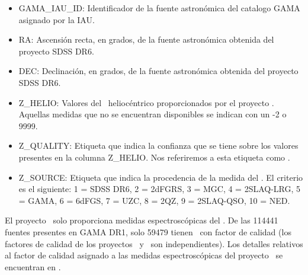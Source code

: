 \begin{itemize}
    \setlength\itemsep{-1mm}
    \item GAMA\_IAU\_ID: Identificador de la fuente astronómica del catalogo GAMA asignado por la IAU.
    \item RA: Ascensión recta, en grados, de la fuente astronómica obtenida del proyecto SDSS DR6.
    \item DEC: Declinación, en grados, de la fuente astronómica obtenida del proyecto SDSS DR6.
    \item Z\_HELIO: Valores del \rt\ heliocéntrico proporcionados por el proyecto \gama. Aquellas medidas que no se encuentran disponibles se indican con un -2 o 9999.
    \item Z\_QUALITY: Etiqueta que indica la confianza que se tiene sobre los valores presentes en la columna Z\_HELIO. Nos referiremos a esta etiqueta como .
    \item Z\_SOURCE: Etiqueta que indica la  procedencia de la medida del \rt. El criterio es el siguiente: 1 = SDSS DR6, 2 = 2dFGRS, 3 = MGC, 4 = 2SLAQ-LRG, 5 = GAMA, 6 = 6dFGS, 7 = UZC, 8 = 2QZ, 9 = 2SLAQ-QSO, 10 = NED.
    
    
\end{itemize}

El proyecto \gama\ solo proporciona medidas espectroscópicas del \rt. De las 114441 fuentes presentes en GAMA DR1, solo 59479 tienen \rt\ con factor de calidad  (los factores de calidad de los proyectos \gama\ y \hatlas\ son independientes). Los detalles relativos al factor de calidad asignado a las medidas espectroscópicas del proyecto \gama\ se encuentran en \cite{article:Driver_2011}. 

\vspace{-4mm}

